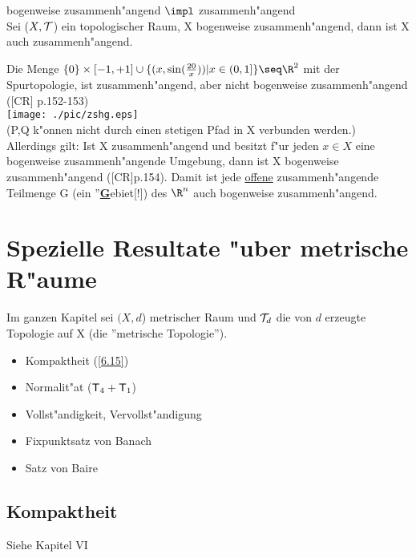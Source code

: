 \begin{prop}\label{7.7}{bogenweise zusammenh"angend $\impl$ zusammenh"angend}\\
Sei ($X,\mathcal T$) ein topologischer Raum, X bogenweise zusammenh"angend, dann ist X auch zusammenh"angend.
\end{prop}
Die Menge $\{ 0\}\times [-1,+1]\cup\{ (x,\sin(\frac{20}{x}) )|x\in (0,1]\}\seq \R^2$ mit der Spurtopologie, ist zusammenh"angend, aber nicht bogenweise zusammenh"angend ([CR] p.152-153)\\
\texttt{[image: ./pic/zshg.eps]}\\
(P,Q k"onnen nicht durch einen stetigen Pfad in X verbunden werden.)\\
Allerdings gilt: Ist X zusammenh"angend und besitzt f"ur jeden $x\in X$ eine bogenweise zusammenh"angende Umgebung, dann ist X bogenweise zusammenh"angend ([CR]p.154). Damit ist jede \ul{offene} zusammenh"angende Teilmenge G (ein ''\ul{\bf G}ebiet[!]) des $\R^n$ auch bogenweise zusammenh"angend.

\section{Spezielle Resultate "uber metrische R"aume}
Im ganzen Kapitel sei $(X, d$) metrischer Raum und $\mathcal T_d$ die von $d$ erzeugte Topologie auf X (die ''metrische Topologie'').
\begin{itemize}
\item Kompaktheit (\ref{6.15}) 
\item Normalit"at ($\mbox{\sf T}_4 +\mbox{\sf T}_1$)
\item Vollst"andigkeit, Vervollst"andigung
\item Fixpunktsatz von {\sc Banach}\item Satz von {\sc Baire}
\end{itemize}
\subsection{Kompaktheit}
Siehe Kapitel VI
